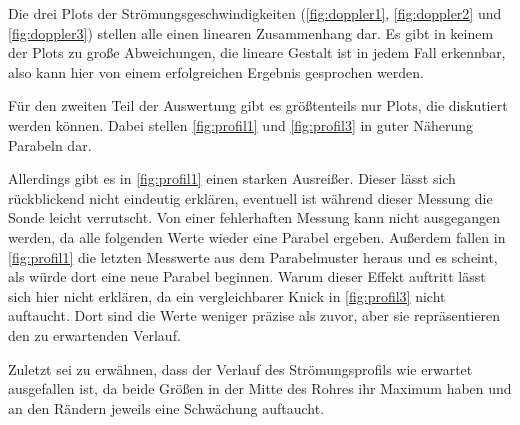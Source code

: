 Die drei Plots der Strömungsgeschwindigkeiten (\autoref{fig:doppler1}, \autoref{fig:doppler2} und \autoref{fig:doppler3}) stellen alle einen linearen Zusammenhang dar. 
Es gibt in keinem der Plots zu große Abweichungen, die lineare Gestalt ist in jedem Fall erkennbar, also kann hier von einem erfolgreichen Ergebnis gesprochen werden.

Für den zweiten Teil der Auswertung gibt es größtenteils nur Plots, die diskutiert werden können.
Dabei stellen \autoref{fig:profil1} und \autoref{fig:profil3} in guter Näherung Parabeln dar. 

Allerdings gibt es in \autoref{fig:profil1} einen starken Ausreißer.
Dieser lässt sich rückblickend nicht eindeutig erklären, eventuell ist während dieser Messung die Sonde leicht verrutscht. 
Von einer fehlerhaften Messung kann nicht ausgegangen werden, da alle folgenden Werte wieder eine Parabel ergeben.
Außerdem fallen in \autoref{fig:profil1} die letzten Messwerte aus dem Parabelmuster heraus und es scheint, als würde dort eine neue Parabel beginnen.
Warum dieser Effekt auftritt lässt sich hier nicht erklären, da ein vergleichbarer Knick in \autoref{fig:profil3} nicht auftaucht. 
Dort sind die Werte weniger präzise als zuvor, aber sie repräsentieren den zu erwartenden Verlauf. 

Zuletzt sei zu erwähnen, dass der Verlauf des Strömungsprofils wie erwartet ausgefallen ist, da beide Größen in der Mitte des Rohres ihr Maximum haben und an den Rändern jeweils eine Schwächung auftaucht.